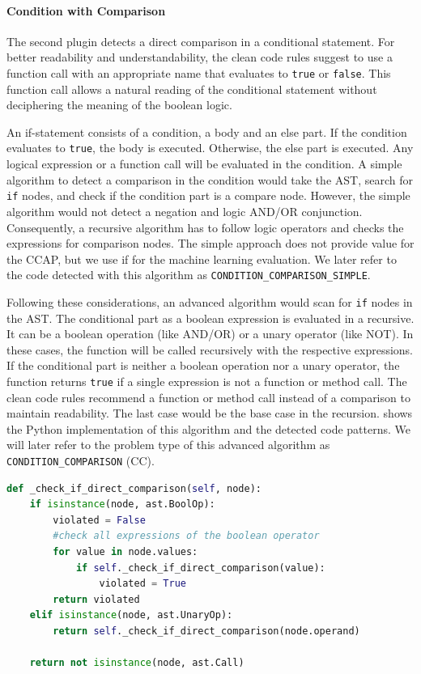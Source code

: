 \paragraph{Condition with Comparison}\label{sec:condition_comparison}
The second plugin detects a direct comparison in a conditional statement. For better readability and understandability, the clean code rules suggest to use a function call with an appropriate name that evaluates to \texttt{true} or \texttt{false}. This function call allows a natural reading of the conditional statement without deciphering the meaning of the boolean logic.

An if-statement consists of a condition, a body and an else part. If the condition evaluates to \texttt{true}, the body is executed. Otherwise, the else part is executed. Any logical expression or a function call will be evaluated in the condition. A simple algorithm to detect a comparison in the condition would take the AST, search for \texttt{if} nodes, and check if the condition part is a compare node.
However, the simple algorithm would not detect a negation and logic AND/OR conjunction. Consequently, a recursive algorithm has to follow logic operators and checks the expressions for comparison nodes. The simple approach does not provide value for the CCAP, but we use if for the machine learning evaluation. We later refer to the code detected with this algorithm as \texttt{CONDITION\_COMPARISON\_SIMPLE}.

Following these considerations, an advanced algorithm would scan for \texttt{if} nodes in the AST. The conditional part as a boolean expression is evaluated in a recursive. It can be a boolean operation (like AND/OR) or a unary operator (like NOT). In these cases, the function will be called recursively with the respective expressions. If the conditional part is neither a boolean operation nor a unary operator, the function returns \texttt{true} if a single expression is not a function or method call. The clean code rules recommend a function or method call instead of a comparison to maintain readability. 
The last case would be the base case in the recursion.  shows the Python implementation of this algorithm and the detected code patterns. We will later refer to the problem type of this advanced algorithm as \texttt{CONDITION\_COMPARISON} (CC). 
\begin{lstlisting}[float, floatplacement=h, language=Python, label=lst:condition_coparison, caption={Recursive function to analyse an if statement for direct comparisons. Since a condition should contain a method call, the function returns False if this is not the case.}]
def _check_if_direct_comparison(self, node):
    if isinstance(node, ast.BoolOp):
        violated = False
        #check all expressions of the boolean operator
        for value in node.values:
            if self._check_if_direct_comparison(value):
                violated = True
        return violated
    elif isinstance(node, ast.UnaryOp):
        return self._check_if_direct_comparison(node.operand)

    return not isinstance(node, ast.Call)\end{lstlisting}

